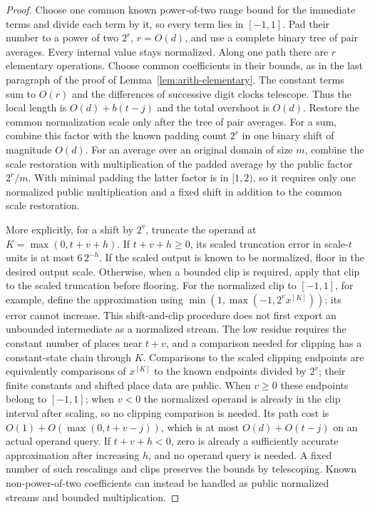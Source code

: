 \begin{proof}
Choose one common known power-of-two range bound for the immediate
terms and divide each term by it, so every term lies in $[-1,1]$.
Pad their number to a power of two $2^r$, $r=O(d)$, and use a complete
binary tree of pair averages.  Every internal value stays normalized.
Along one path there are $r$ elementary operations.  Choose common
coefficients in their bounds, as in the last paragraph of the
proof of Lemma~\ref{lem:arith-elementary}.  The constant terms
sum to $O(r)$ and the differences of successive digit clocks
telescope.  Thus the local length is $O(d)+b(t-j)$ and the
total overshoot is $O(d)$.  Restore the common normalization scale
only after the tree of pair averages.  For a sum, combine this factor
with the known padding count $2^r$ in one binary shift of magnitude
$O(d)$.  For an average over an original domain of size $m$, combine
the scale restoration with multiplication of the padded average by
the public factor $2^r/m$.  With minimal padding the latter factor
is in $[1,2)$, so it requires only one normalized public multiplication
and a fixed shift in addition to the common scale restoration.

More explicitly, for a shift by $2^v$, truncate the operand at
$K=\max(0,t+v+h)$.  If $t+v+h\geq0$, its scaled truncation
error in scale-$t$ units is at most $6\,2^{-h}$.  If the scaled
output is known to be normalized, floor in the desired output
scale.  Otherwise, when a bounded clip is required, apply that
clip to the scaled truncation before flooring.  For the
normalized clip to $[-1,1]$, for example, define the approximation
using $\min(1,\max(-1,2^v x^{[K]}))$; its error cannot increase.
This shift-and-clip procedure does not first export an unbounded
intermediate as a normalized stream.
The low residue requires the constant number of places near
$t+v$, and a comparison needed for clipping has a constant-state
chain through $K$.  Comparisons to the scaled clipping endpoints
are equivalently comparisons of $x^{[K]}$ to the known endpoints
divided by $2^v$; their finite constants and shifted place data
are public.  When $v\geq0$ these endpoints belong to $[-1,1]$;
when $v<0$ the normalized operand is already in the clip interval
after scaling, so no clipping comparison is needed.  Its path cost is
$O(1)+O(\max(0,t+v-j))$, which is at most
$O(d)+O(t-j)$ on an actual operand query.  If $t+v+h<0$, zero
is already a sufficiently accurate approximation after increasing
$h$, and no operand query is needed.  A fixed number of such
rescalings and clips preserves the bounds by telescoping.
Known non-power-of-two coefficients can instead be handled as
public normalized streams and bounded multiplication.
\end{proof}

